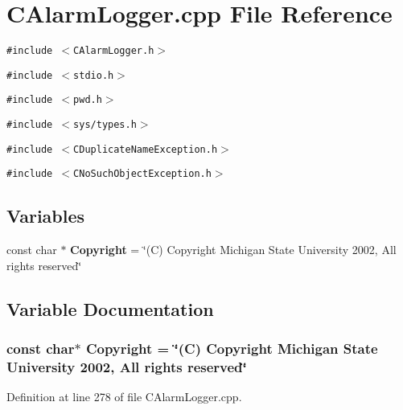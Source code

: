 \section{CAlarm\-Logger.cpp File Reference}
\label{CAlarmLogger_8cpp}
{\tt \#include $<$CAlarm\-Logger.h$>$}\par
{\tt \#include $<$stdio.h$>$}\par
{\tt \#include $<$pwd.h$>$}\par
{\tt \#include $<$sys/types.h$>$}\par
{\tt \#include $<$CDuplicate\-Name\-Exception.h$>$}\par
{\tt \#include $<$CNo\-Such\-Object\-Exception.h$>$}\par
\subsection*{Variables}
\begin{CompactItemize}
\item 
const char $\ast$ {\bf Copyright} = \char`\"{}(C) Copyright Michigan State University 2002, All rights reserved\char`\"{}
\end{CompactItemize}


\subsection{Variable Documentation}
\subsubsection{\setlength{\rightskip}{0pt plus 5cm}const char$\ast$ Copyright = \char`\"{}(C) Copyright Michigan State University 2002, All rights reserved\char`\"{}\hspace{0.3cm}{\tt  [static]}}\label{CAlarmLogger_8cpp_a0}




Definition at line 278 of file CAlarm\-Logger.cpp.